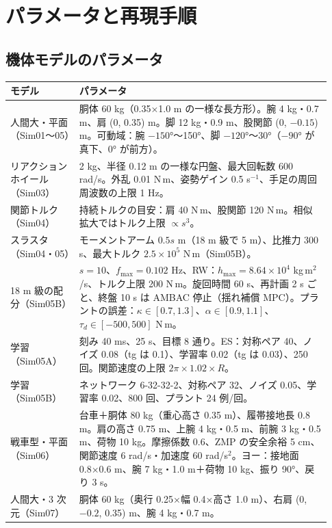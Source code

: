 \chapter{パラメータと再現手順}\label{app:param}

\section{機体モデルのパラメータ}

\begin{longtable}{p{0.20\linewidth}p{0.73\linewidth}}
\toprule
モデル & パラメータ \\ \midrule \endhead
人間大・平面（Sim01〜05） & 胴体 60 kg（0.35×1.0 m の一様な長方形）。腕 4 kg・0.7 m、肩 (0, 0.35) m。脚 12 kg・0.9 m、股関節 (0, $-0.15$) m。可動域：腕 $-150$°〜150°、脚 $-120$°〜30°（$-90$° が真下、0° が前方）。 \\
リアクションホイール（Sim03） & 2 kg、半径 0.12 m の一様な円盤、最大回転数 600 rad/s。外乱 0.01 N\,m、姿勢ゲイン 0.5 s$^{-1}$、手足の周回周波数の上限 1 Hz。 \\
関節トルク（Sim04） & 持続トルクの目安：肩 40 N\,m、股関節 120 N\,m。相似拡大ではトルク上限 $\propto s^3$。 \\
スラスタ（Sim04・05） & モーメントアーム $0.5s$ m（18 m 級で 5 m）、比推力 300 s、最大トルク $2.5\times10^5$ N\,m（Sim05B）。 \\
18 m 級の配分（Sim05B） & $s=10$、$f_{\max}=0.102$ Hz、RW：$h_{\max}=8.64\times10^4$ kg\,m$^2$/s、トルク上限 200 N\,m。旋回時間 60 s、再計画 2 s ごと、終盤 10 s は AMBAC 停止（揺れ補償 MPC）。プラントの誤差：$\kappa\in[0.7,1.3]$、$\alpha\in[0.9,1.1]$、$\tau_d\in[-500,500]$ N\,m。 \\
学習（Sim05A） & 刻み 40 ms、25 s、目標 8 通り。ES：対称ペア 40、ノイズ 0.08（tg は 0.1）、学習率 0.02（tg は 0.03）、250 回。関節速度の上限 $2\pi\times1.02\times R$。 \\
学習（Sim05B） & ネットワーク 6-32-32-2、対称ペア 32、ノイズ 0.05、学習率 0.02、800 回、プラント 24 例/回。 \\
戦車型・平面（Sim06） & 台車＋胴体 80 kg（重心高さ 0.35 m）、履帯接地長 0.8 m。肩の高さ 0.75 m、上腕 4 kg・0.5 m、前腕 3 kg・0.5 m、荷物 10 kg。摩擦係数 0.6、ZMP の安全余裕 5 cm、関節速度 6 rad/s・加速度 60 rad/s$^2$。ヨー：接地面 0.8×0.6 m、腕 7 kg・1.0 m＋荷物 10 kg、振り 90°、戻り 3 s。 \\
人間大・3 次元（Sim07） & 胴体 60 kg（奥行 0.25×幅 0.4×高さ 1.0 m）、右肩 (0, $-0.2$, 0.35) m、腕 4 kg・0.7 m。 \\

\end{longtable}
